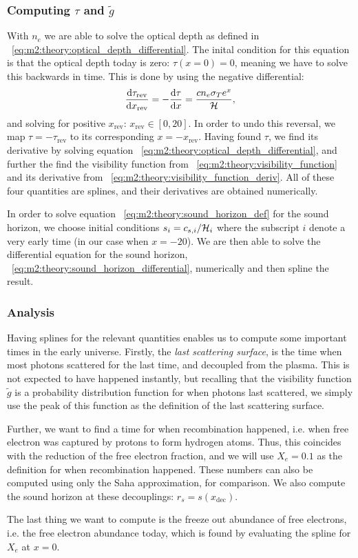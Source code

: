\subsubsection{Computing $\tau$ and $\tilde{g}$}\label{sec:m2:methods:tau_and_g}
    With $n_e$ we are able to solve the optical depth as defined in ~\cref{eq:m2:theory:optical_depth_differential}. The inital condition for this equation is that the optical depth today is zero: $\tau(x=0)=0$, meaning we have to solve this backwards in time. This is done by using the negative differential:
    \begin{equation}
        \dv{\tau_\mathrm{rev}}{x_\mathrm{rev}} = -\dv{\tau}{x} = \frac{cn_e\sigma_Te^x}{\mathcal{H}},
    \end{equation}
    and solving for positive $x_\mathrm{rev}$: $x_\mathrm{rev}\in[0,20]$. In order to undo this reversal, we map $\tau=-\tau_\mathrm{rev}$ to its corresponding $x=-x_\mathrm{rev}$. Having found $\tau$, we find its derivative by solving equation ~\cref{eq:m2:theory:optical_depth_differential}, and further the find the visibility function from ~\cref{eq:m2:theory:visibility_function} and its derivative from ~\cref{eq:m2:theory:visibility_function_deriv}. All of these four quantities are splines, and their derivatives are obtained numerically.

    In order to solve equation ~\cref{eq:m2:theory:sound_horizon_def} for the sound horizon, we choose initial conditions $s_i = c_{s,i}/{\mathcal{H}_i}$ where the subscript $i$ denote a very early time (in our case when $x=-20$). We are then able to solve the differential equation for the sound horizon, ~\cref{eq:m2:theory:sound_horizon_differential}, numerically and then spline the result. 


\subsubsection{Analysis}\label{sec:m2:methods:analysis}
    Having splines for the relevant quantities enables us to compute some important times in the early universe. Firstly, the \textit{last scattering surface}, is the time when most photons scattered for the last time, and decoupled from the plasma. This is not expected to have happened instantly, but recalling that the visibility function $\tilde{g}$ is a probability distribution function for when photons last scattered, we simply use the peak of this function as the definition of the last scattering surface. 

    Further, we want to find a time for when recombination happened, i.e. when free electron was captured by protons to form hydrogen atoms. Thus, this coincides with the reduction of the free electron fraction, and we will use $X_e=0.1$ as the definition for when recombination happened. These numbers can also be computed using only the Saha approximation, for comparison. We also compute the sound horizon at these decouplings: $r_s = s(x_\mathrm{dec})$.

    The last thing we want to compute is the freeze out abundance of free electrons, i.e. the free electron abundance today, which is found by evaluating the spline for $X_e$ at $x=0$.



